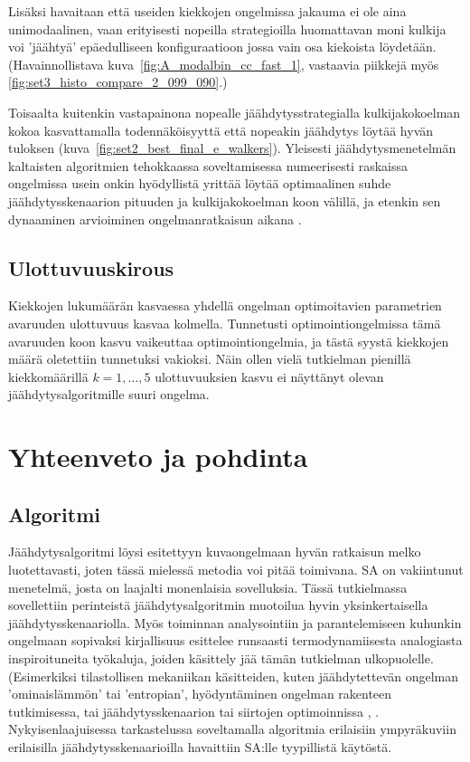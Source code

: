 Lisäksi havaitaan että useiden kiekkojen ongelmissa jakauma ei ole aina unimodaalinen,
vaan erityisesti nopeilla strategioilla huomattavan moni kulkija voi 'jäähtyä' epäedulliseen konfiguraatioon jossa vain osa kiekoista löydetään.
(Havainnollistava kuva~\ref{fig:A_modalbin_cc_fast_1}, vastaavia piikkejä myös \ref{fig:set3_histo_compare_2_099_090}.)

Toisaalta kuitenkin vastapainona nopealle jäähdytysstrategialla kulkijakokoelman kokoa kasvattamalla todennäköisyyttä että nopeakin jäähdytys löytää hyvän tuloksen (kuva~\ref{fig:set2_best_final_e_walkers}).
Yleisesti jäähdytysmenetelmän kaltaisten algoritmien tehokkaassa soveltamisessa numeerisesti raskaissa ongelmissa usein onkin hyödyllistä yrittää löytää optimaalinen suhde jäähdytysskenaarion pituuden ja kulkijakokoelman koon välillä, ja etenkin sen dynaaminen arvioiminen ongelmanratkaisun aikana \cite{salamonetal}.

\subsection{Ulottuvuuskirous}
\label{sub:ulottuvuuskirous}

Kiekkojen lukumäärän kasvaessa yhdellä ongelman optimoitavien parametrien avaruuden ulottuvuus kasvaa kolmella.
Tunnetusti optimointiongelmissa tämä avaruuden koon kasvu vaikeuttaa optimointiongelmia, ja tästä syystä kiekkojen määrä oletettiin tunnetuksi vakioksi.
Näin ollen vielä tutkielman pienillä kiekkomäärillä $k = 1, \dots, 5$ ulottuvuuksien kasvu ei näyttänyt olevan jäähdytysalgoritmille suuri ongelma.

\section{Yhteenveto ja pohdinta}
\label{sec:johtopaatokset}

\subsection{Algoritmi}
\label{sub:jp_algoritmi}

Jäähdytysalgoritmi löysi esitettyyn kuvaongelmaan hyvän ratkaisun melko luotettavasti,
joten tässä mielessä metodia voi pitää toimivana.
SA on vakiintunut menetelmä, josta on laajalti monenlaisia sovelluksia.
Tässä tutkielmassa sovellettiin perinteistä jäähdytysalgoritmin muotoilua hyvin yksinkertaisella jäähdytysskenaariolla.
Myös toiminnan analysointiin ja parantelemiseen kuhunkin ongelmaan sopivaksi kirjallisuus esittelee runsaasti termodynamiisesta analogiasta inspiroituneita työkaluja,
joiden käsittely jää tämän tutkielman ulkopuolelle.
(Esimerkiksi tilastollisen mekaniikan käsitteiden, kuten jäähdytettevän ongelman 'ominaislämmön' tai 'entropian', hyödyntäminen ongelman rakenteen tutkimisessa, tai jäähdytysskenaarion tai siirtojen optimoinnissa , \cite[ks.][]{salamonetal}.
Nykyisenlaajuisessa tarkastelussa soveltamalla algoritmia erilaisiin ympyräkuviin erilaisilla jäähdytysskenaarioilla havaittiin SA:lle tyypillistä käytöstä.


